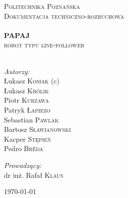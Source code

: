 \begin{titlepage}
\begin{center}


\textsc{\LARGE Politechnika Poznańska}\\[1.5cm]

\textsc{\Large Dokumentacja techniczno-rozruchowa}\\[0.5cm]

\HRule \\[0.4cm]
{ \huge \bfseries PAPAJ \\[0.4cm] }
\textsc{\Large robot typu line-follower}\\[0.5cm]

\HRule \\[1.5cm]

\noindent
\begin{minipage}[t]{0.4\textwidth}
\begin{flushleft} \large
\emph{Autorzy:}\\
Łukasz \textsc{Kosiak} (c)\\
Łukasz \textsc{Królik} \\
Piotr \textsc{Kurzawa} \\
Patryk \textsc{Łapiezo} \\
Sebastian \textsc{Pawlak} \\
Bartosz \textsc{Sławianowski} \\
Kacper \textsc{Stępień} \\
Pedro \textsc{Brêda}
\end{flushleft}
\end{minipage}%
\begin{minipage}[t]{0.4\textwidth}
\begin{flushright} \large
\emph{Prowadzący:} \\
dr inż. Rafał \textsc{Klaus}
\end{flushright}
\end{minipage}

\vfill

{\large \today}

\end{center}
\end{titlepage}
